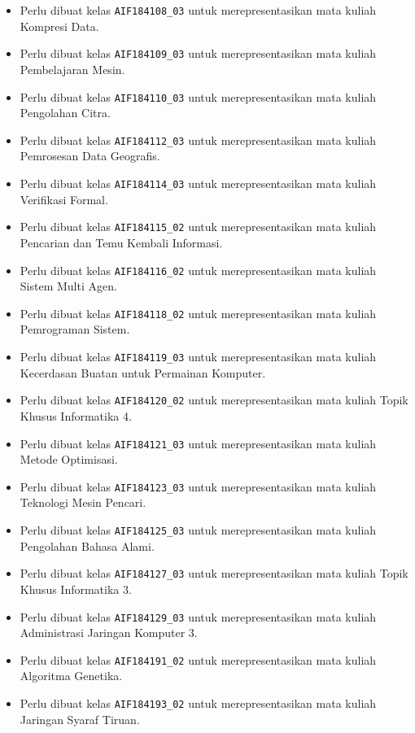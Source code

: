 \documentclass[a4paper,twoside]{article}
\begin{document}
\begin{enumerate}
\begin{enumerate}
\begin{enumerate}
\begin{itemize}
					\item Perlu dibuat kelas \texttt{AIF184108\_03} untuk merepresentasikan mata kuliah Kompresi Data.
					\item Perlu dibuat kelas \texttt{AIF184109\_03} untuk merepresentasikan mata kuliah Pembelajaran Mesin.
					\item Perlu dibuat kelas \texttt{AIF184110\_03} untuk merepresentasikan mata kuliah Pengolahan Citra.
					\item Perlu dibuat kelas \texttt{AIF184112\_03} untuk merepresentasikan mata kuliah Pemrosesan Data Geografis.
					\item Perlu dibuat kelas \texttt{AIF184114\_03} untuk merepresentasikan mata kuliah Verifikasi Formal.
					\item Perlu dibuat kelas \texttt{AIF184115\_02} untuk merepresentasikan mata kuliah Pencarian dan Temu Kembali Informasi.
					\item Perlu dibuat kelas \texttt{AIF184116\_02} untuk merepresentasikan mata kuliah Sistem Multi Agen.
					\item Perlu dibuat kelas \texttt{AIF184118\_02} untuk merepresentasikan mata kuliah Pemrograman Sistem.
					\item Perlu dibuat kelas \texttt{AIF184119\_03} untuk merepresentasikan mata kuliah Kecerdasan Buatan untuk Permainan Komputer.
					\item Perlu dibuat kelas \texttt{AIF184120\_02} untuk merepresentasikan mata kuliah Topik Khusus Informatika 4.
					\item Perlu dibuat kelas \texttt{AIF184121\_03} untuk merepresentasikan mata kuliah Metode Optimisasi.
					\item Perlu dibuat kelas \texttt{AIF184123\_03} untuk merepresentasikan mata kuliah Teknologi Mesin Pencari.
					\item Perlu dibuat kelas \texttt{AIF184125\_03} untuk merepresentasikan mata kuliah Pengolahan Bahasa Alami.
					\item Perlu dibuat kelas \texttt{AIF184127\_03} untuk merepresentasikan mata kuliah Topik Khusus Informatika 3.
					\item Perlu dibuat kelas \texttt{AIF184129\_03} untuk merepresentasikan mata kuliah Administrasi Jaringan Komputer 3.
					\item Perlu dibuat kelas \texttt{AIF184191\_02} untuk merepresentasikan mata kuliah Algoritma Genetika.
					\item Perlu dibuat kelas \texttt{AIF184193\_02} untuk merepresentasikan mata kuliah Jaringan Syaraf Tiruan.

\end{itemize}
\end{enumerate}
\end{enumerate}
\end{enumerate}
\end{document}
